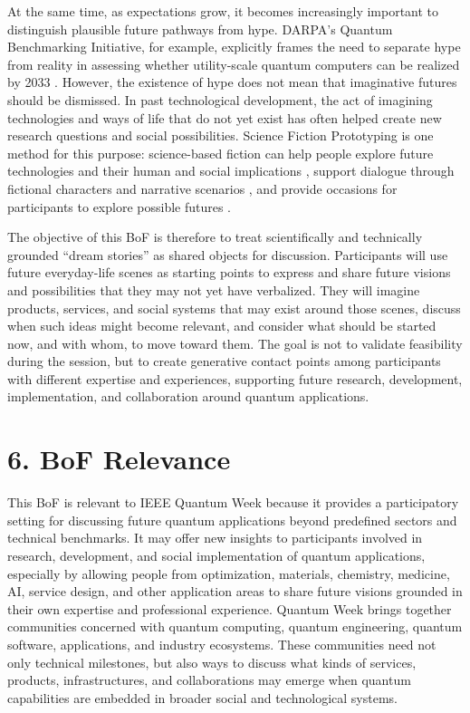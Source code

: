 \documentclass[10pt,conference]{IEEEtran}
\begin{document}
At the same time, as expectations grow, it becomes increasingly important to distinguish plausible future pathways from hype. DARPA's Quantum Benchmarking Initiative, for example, explicitly frames the need to separate hype from reality in assessing whether utility-scale quantum computers can be realized by 2033 \cite{darpa_qbi}. However, the existence of hype does not mean that imaginative futures should be dismissed. In past technological development, the act of imagining technologies and ways of life that do not yet exist has often helped create new research questions and social possibilities. Science Fiction Prototyping is one method for this purpose: science-based fiction can help people explore future technologies and their human and social implications \cite{johnson_sfp}, support dialogue through fictional characters and narrative scenarios \cite{burnam_fink}, and provide occasions for participants to explore possible futures \cite{draudt}.

The objective of this BoF is therefore to treat scientifically and technically grounded ``dream stories'' as shared objects for discussion. Participants will use future everyday-life scenes as starting points to express and share future visions and possibilities that they may not yet have verbalized. They will imagine products, services, and social systems that may exist around those scenes, discuss when such ideas might become relevant, and consider what should be started now, and with whom, to move toward them. The goal is not to validate feasibility during the session, but to create generative contact points among participants with different expertise and experiences, supporting future research, development, implementation, and collaboration around quantum applications.

\section*{6. BoF Relevance}

This BoF is relevant to IEEE Quantum Week because it provides a participatory setting for discussing future quantum applications beyond predefined sectors and technical benchmarks. It may offer new insights to participants involved in research, development, and social implementation of quantum applications, especially by allowing people from optimization, materials, chemistry, medicine, AI, service design, and other application areas to share future visions grounded in their own expertise and professional experience. Quantum Week brings together communities concerned with quantum computing, quantum engineering, quantum software, applications, and industry ecosystems. These communities need not only technical milestones, but also ways to discuss what kinds of services, products, infrastructures, and collaborations may emerge when quantum capabilities are embedded in broader social and technological systems.
\end{document}

